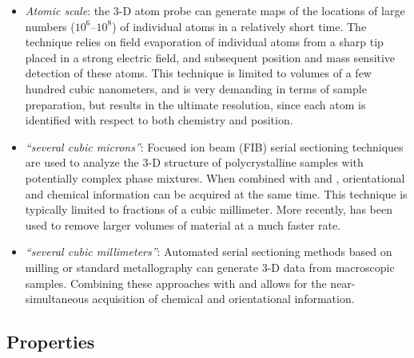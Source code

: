 \begin{itemize}
\item \textit{Atomic scale}:  the  3-D  atom probe \cite{seidman2000a,miller2004a,hono2005a} can generate maps of the locations of large numbers ($10^6$--$10^8$) of individual atoms in a relatively short time. The technique relies on field evaporation of individual atoms from a sharp tip placed in a strong electric field, and subsequent position and mass sensitive detection of these atoms.  This technique is limited to volumes of a few hundred cubic nanometers, and is very demanding in terms of sample preparation, but results in the ultimate resolution, since each atom is identified with respect to both chemistry and position.

\item \textit{``several cubic microns''}:  Focused ion beam (FIB) serial sectioning techniques \cite{dunn1999a,uchic2006a} are used to analyze the 3-D  structure of polycrystalline samples with potentially complex phase mixtures.  When combined with  and , orientational and chemical information can be acquired at the same time.  This technique is typically limited to fractions of a cubic millimeter.  More recently,  \cite{Echlin2015} has been used to remove larger volumes of material at a much faster rate.

\item \textit{``several cubic millimeters''}: Automated serial sectioning methods based on milling \cite{alkemper2001a} or standard metallography \cite{spowart2003a} can generate  3-D  data from macroscopic samples. Combining these approaches  with  and  allows for the near-simultaneous acquisition of chemical and orientational information.
\end{itemize}

\subsection{Properties}
\label{\chabbr:ssec:properties}

